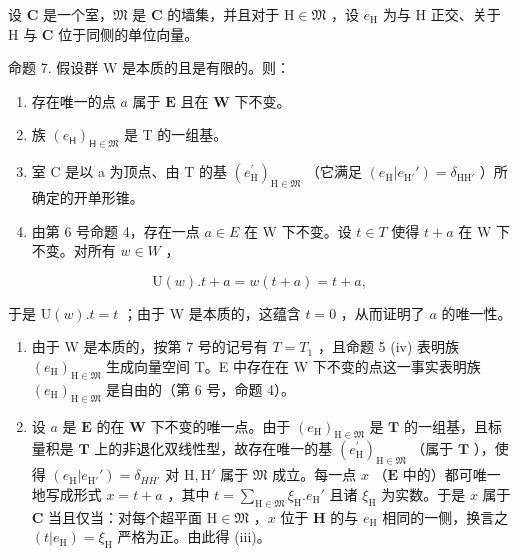 设 \(\mathbf{C}\) 是一个室，\(\mathfrak{M}\) 是 \(\mathbf{C}\) 的墙集，并且对于 \(\mathrm{H} \in \mathfrak{M}\) ，设 \(e_{\mathrm{H}}\) 为与 \(\mathrm{H}\) 正交、关于 \(\mathrm{H}\) 与 \(\mathbf{C}\) 位于同侧的单位向量。

命题 7. 假设群 W 是本质的且是有限的。则：

\begin{enumerate}
\def\labelenumi{(\roman{enumi})}
\item
  存在唯一的点 \(a\) 属于 \(\mathbf{E}\) 且在 \(\mathbf{W}\) 下不变。
\item
  族 \((e_{\mathsf{H}})_{\mathsf{H}\in \mathfrak{M}}\) 是 \(\mathrm{T}\) 的一组基。
\item
  室 C 是以 a 为顶点、由 T 的基 \((e_{\mathrm{H}}^{\prime})_{\mathrm{H}\in \mathfrak{M}}\) （它满足 \((e_{\mathrm{H}}|e_{\mathrm{H}'}') = \delta_{\mathrm{HH}'}\) ）所确定的开单形锥。
\item
  由第 6 号命题 4，存在一点 \(a \in E\) 在 W 下不变。设 \(t \in T\) 使得 \(t + a\) 在 W 下不变。对所有 \(w \in W\) ，
\end{enumerate}

\[
\mathrm{U} (w). t + a = w (t + a) = t + a,
\]

于是 \(\mathrm{U}(w).t = t\) ；由于 \(\mathrm{W}\) 是本质的，这蕴含 \(t = 0\) ，从而证明了 \(a\) 的唯一性。

\begin{enumerate}
\def\labelenumi{(\roman{enumi})}
\setcounter{enumi}{1}
\item
  由于 W 是本质的，按第 7 号的记号有 \(T = T_{1}\) ，且命题 5 (iv) 表明族 \((e_{\mathrm{H}})_{\mathrm{H}\in\mathfrak{M}}\) 生成向量空间 T。E 中存在在 W 下不变的点这一事实表明族 \((e_{\mathrm{H}})_{\mathrm{H}\in\mathfrak{M}}\) 是自由的（第 6 号，命题 4）。
\item
  设 \(a\) 是 \(\mathbf{E}\) 的在 \(\mathbf{W}\) 下不变的唯一点。由于 \((e_{\mathrm{H}})_{\mathrm{H}\in \mathfrak{M}}\) 是 \(\mathbf{T}\) 的一组基，且标量积是 \(\mathbf{T}\) 上的非退化双线性型，故存在唯一的基 \((e_{\mathrm{H}}^{\prime})_{\mathrm{H}\in \mathfrak{M}}\) （属于 \(\mathbf{T}\) ），使得 \((e_{\mathrm{H}}|e_{\mathrm{H}'}') = \delta_{HH'}\) 对 \(\mathrm{H},\mathrm{H}'\) 属于 \(\mathfrak{M}\) 成立。每一点 \(x\) （\(\mathbf{E}\) 中的）都可唯一地写成形式 \(x = t + a\) ，其中 \(t = \sum_{\mathrm{H}\in \mathfrak{M}}\xi_{\mathrm{H}}.e_{\mathrm{H}}'\) 且诸 \(\xi_{\mathrm{H}}\) 为实数。于是 \(x\) 属于 \(\mathbf{C}\) 当且仅当：对每个超平面 \(\mathrm{H}\in \mathfrak{M}\) ，\(x\) 位于 \(\mathbf{H}\) 的与 \(e_{\mathrm{H}}\) 相同的一侧，换言之 \((t|e_{\mathrm{H}}) = \xi_{\mathrm{H}}\) 严格为正。由此得 (iii)。
\end{enumerate}


